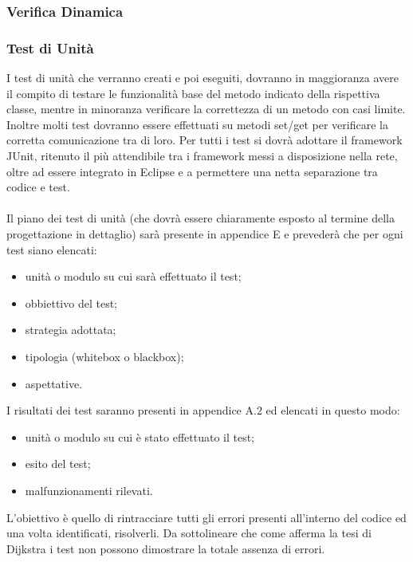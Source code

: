 \subsubsection{Verifica Dinamica}

\subsubsection*{Test di Unit\`a}

I test di unit\`a che verranno creati e poi eseguiti, dovranno in maggioranza
avere il compito di testare le funzionalit\`a base del metodo indicato della
rispettiva classe, mentre in minoranza verificare la
correttezza di un metodo con casi limite. Inoltre molti test dovranno essere
effettuati su metodi set/get per verificare la corretta comunicazione tra di
loro. Per tutti i test si dovr\`a adottare il framework JUnit, ritenuto il pi\`u
attendibile tra i framework messi a disposizione nella rete, oltre ad essere
integrato in Eclipse e a permettere una netta separazione tra codice e test.
\\\\
Il piano dei test di unit\`a (che dovr\`a essere chiaramente esposto al termine
della progettazione in dettaglio) sar\`a presente in
appendice E e preveder\`a che per ogni test siano elencati:
\begin{itemize}
  \item unit\`a o modulo su cui sar\`a effettuato il test;
  \item obbiettivo del test;
  \item strategia adottata;
  \item tipologia (whitebox o blackbox);
  \item aspettative.
\end{itemize}

I risultati dei test saranno presenti in appendice A.2 ed elencati in
questo modo:
\begin{itemize}
  \item unit\`a o modulo su cui \`e stato effettuato il test;
  \item esito del test;
  \item malfunzionamenti rilevati.
\end{itemize}

L'obiettivo \`e quello di rintracciare tutti gli errori presenti all'interno del
codice ed una volta identificati, risolverli. Da sottolineare che come afferma la tesi di Dijkstra 
i test non possono dimostrare la totale assenza di errori.


